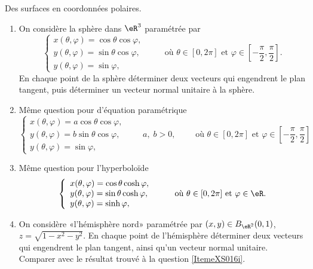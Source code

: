 \begin{exercice}\label{exoCourbesSurfaces0016}

	Des surfaces en coordonnées polaires.
	\begin{enumerate}
		\item	\label{ItemeXS016i}

On considère la sphère dans $ \eR^3$ paramétrée par 
\begin{equation}
\left\{
\begin{array}{l}
x( \theta, \varphi) = \cos \theta \cos \varphi, \\
y( \theta, \varphi) = \sin \theta \cos \varphi, \\
y( \theta, \varphi) = \sin \varphi, 
\end{array}
\right.
\qquad \mbox{ où } \theta \in [0, 2 \pi] \mbox{ et } \varphi \in \left[ - \frac{ \pi}{2}, \frac{ \pi}{2} \right].
\end{equation}
En chaque point de la sphère déterminer deux vecteurs qui engendrent le plan tangent, 
puis déterminer un vecteur normal unitaire à la sphère. 

\item
	Même question pour  d'équation paramétrique
	\begin{equation}
\left\{
\begin{array}{l}
x( \theta, \varphi) = a \cos \theta \cos \varphi, \\
y( \theta, \varphi) = b \sin \theta \cos \varphi, \\
y( \theta, \varphi) = \sin \varphi, 
\end{array}
\right.
\qquad a, \; b > 0, 
\qquad \mbox{ où } \theta \in [0, 2 \pi] \mbox{ et } \varphi \in \left[ - \frac{ \pi}{2}, \frac{ \pi}{2} \right]
\end{equation}

\item
Même question pour l'hyperboloïde 
\begin{equation}
\left\{
\begin{array}{l}
x( \theta, \varphi) = \cos \theta \cosh \varphi, \\
y( \theta, \varphi) = \sin \theta \cosh \varphi, \\
y( \theta, \varphi) = \sinh \varphi, 
\end{array}
\right.
\qquad \mbox{ où } \theta \in [0, 2 \pi] \mbox{ et } \varphi \in \eR. %
\end{equation}

\item
	On considère «l'hémisphère nord»  paramétrée par $(x, y) \in B_{\eR^2}(0, 1)$, $ z = \sqrt{ 1 - x^2 - y^2}$.  En chaque point de l'hémisphère déterminer deux vecteurs qui engendrent le plan tangent, ainsi qu'un vecteur normal unitaire. Comparer avec le résultat trouvé à la question \ref{ItemeXS016i}. 


	\end{enumerate}

\end{exercice}
			
